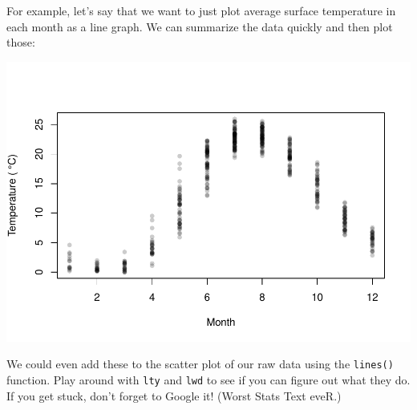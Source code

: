 \documentclass[
]{book}
\newenvironment{Shaded}{\begin{snugshade}}{\end{snugshade}}
\newcommand{\DataTypeTok}[1]{\textcolor[rgb]{0.13,0.29,0.53}{#1}}
\newcommand{\KeywordTok}[1]{\textcolor[rgb]{0.13,0.29,0.53}{\textbf{#1}}}
\newcommand{\NormalTok}[1]{#1}
\newcommand{\OperatorTok}[1]{\textcolor[rgb]{0.81,0.36,0.00}{\textbf{#1}}}
\newcommand{\StringTok}[1]{\textcolor[rgb]{0.31,0.60,0.02}{#1}}
\begin{document}
For example, let's say that we want to just plot average surface temperature in each month as a line graph. We can summarize the data quickly and then plot those:

\begin{Shaded}
\end{Shaded}

\includegraphics{worstr_files/figure-latex/unnamed-chunk-93-1.pdf}

We could even add these to the scatter plot of our raw data using the \texttt{lines()} function. Play around with \texttt{lty} and \texttt{lwd} to see if you can figure out what they do. If you get stuck, don't forget to Google it! (Worst Stats Text eveR.)
\end{document}
